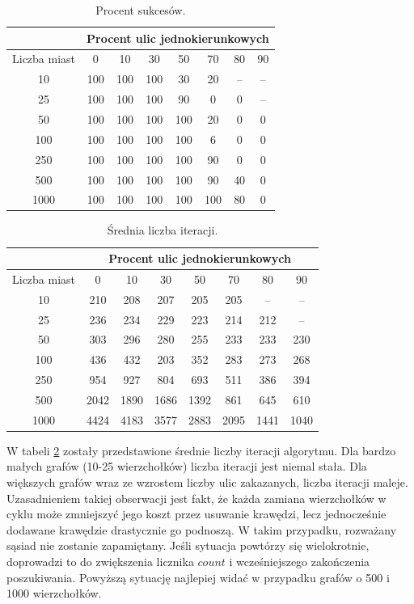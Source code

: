 \documentclass[11pt,a4paper,twoside]{article}
\begin{document}
\bgroup
\def\arraystretch{1.2}
\begin{table}[ht]
\centering
\begin{tabular}{|c|c|c|c|c|c|c|c|}
\hline
 & \multicolumn{7}{c|}{Procent ulic jednokierunkowych}\\\hline
Liczba miast & 0 & 10 & 30 & 50 & 70& 80& 90\\  \hline
10& 100& 100& 100& 30& 20& --& --\\ \hline
25& 100& 100& 100& 90& 0& 0& --\\ \hline
50& 100& 100& 100& 100& 20& 0& 0\\ \hline
100& 100& 100& 100& 100& 6& 0& 0\\ \hline
250& 100& 100& 100& 100& 90& 0& 0\\ \hline
500& 100& 100& 100& 100& 90& 40& 0\\ \hline
1000& 100& 100& 100& 100& 100& 80& 0\\ \hline
\end{tabular}
\caption{Procent sukcesów.}
\label{sukcesy}
\end{table}
\egroup

\bgroup
\def\arraystretch{1.2}
\begin{table}[ht]
\centering
\begin{tabular}{|c|c|c|c|c|c|c|c|}
\hline
 & \multicolumn{7}{c|}{Procent ulic jednokierunkowych}\\\hline
Liczba miast & 0 & 10 & 30 & 50 & 70& 80& 90\\  \hline
10& 210& 208& 207& 205& 205& --& --\\ \hline
25& 236& 234& 229& 223& 214& 212& --\\ \hline
50& 303& 296& 280& 255& 233& 233& 230\\ \hline
100& 436& 432& 203& 352& 283& 273& 268\\ \hline
250& 954& 927& 804& 693& 511& 386& 394\\ \hline
500& 2042& 1890& 1686& 1392& 861& 645& 610\\ \hline
1000& 4424& 4183& 3577& 2883& 2095& 1441& 1040\\ \hline
\end{tabular}
\caption{Średnia liczba iteracji.}
\label{liczbaIteracji}
\end{table}
\egroup

W tabeli \ref{liczbaIteracji} zostały przedstawione średnie liczby iteracji algorytmu. Dla bardzo małych grafów (10-25 wierzchołków) liczba iteracji jest niemal stała. Dla większych grafów wraz ze wzrostem liczby ulic zakazanych, liczba iteracji maleje. Uzasadnieniem takiej obserwacji jest fakt, że każda zamiana wierzchołków w cyklu może zmniejszyć jego koszt przez usuwanie krawędzi, lecz jednocześnie dodawane krawędzie drastycznie go podnoszą. W takim przypadku, rozważany sąsiad nie zostanie zapamiętany. Jeśli sytuacja powtórzy się wielokrotnie, doprowadzi to do zwiększenia licznika $count$ i wcześniejszego zakończenia poszukiwania. Powyższą sytuację najlepiej widać w przypadku grafów o 500 i 1000 wierzchołków.
\end{document}
